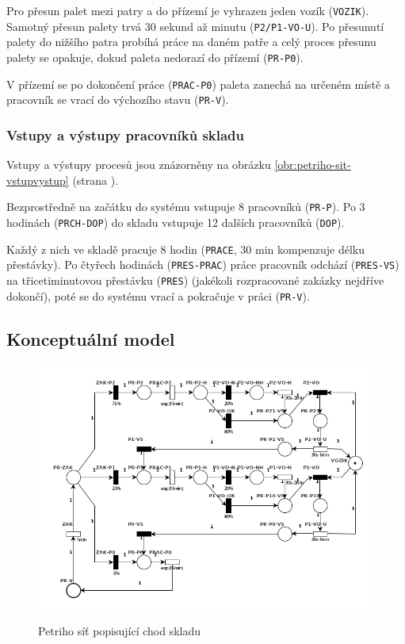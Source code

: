 \documentclass[11pt]{article}
\begin{document}
	Pro přesun palet mezi patry a do přízemí je vyhrazen jeden vozík (\texttt{VOZIK}).
	Samotný přesun palety trvá 30 sekund až minutu (\texttt{P2/P1-VO-U}).
	Po přesunutí palety do nižšího patra probíhá práce na daném patře a celý proces přesunu palety se opakuje, dokud paleta nedorazí do přízemí (\texttt{PR-P0}).
	
	V přízemí se po dokončení práce (\texttt{PRAC-P0}) paleta zanechá na určeném místě a pracovník se vrací do výchozího stavu (\texttt{PR-V}).
	
	\subsubsection{Vstupy a výstupy pracovníků skladu}
	Vstupy a výstupy procesů jsou znázorněny na obrázku \ref{obr:petriho-sit-vstupvystup} (strana \pageref{obr:petriho-sit-vstupvystup}).
	
	Bezprostředně na začátku do systému vstupuje 8 pracovníků (\texttt{PR-P}). Po 3 hodinách (\texttt{PRCH-DOP}) do skladu vstupuje 12 dalších pracovníků (\texttt{DOP}).
	
	Každý z nich ve skladě pracuje 8 hodin (\texttt{PRACE}, 30 min kompenzuje délku přestávky).
	Po čtyřech hodinách (\texttt{PRES-PRAC}) práce pracovník odchází (\texttt{PRES-VS}) na třicetiminutovou přestávku (\texttt{PRES}) (jakékoli rozpracované zakázky nejdříve dokončí), poté se do systému vrací a pokračuje v práci (\texttt{PR-V}).
	
	\subsection{Konceptuální model}
	\begin{figure}[h!]
		\caption{Petriho síť popisující chod skladu}
		\centering
		\includegraphics[width=\textwidth]{images/petri_net_sklad.png}
		\label{obr:petriho-sit-sklad}
	\end{figure}
\end{document}
